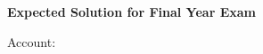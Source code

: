 \documentclass[a4paper]{article}
\begin{document}
\thispagestyle{empty}

\textbf{Expected Solution for Final Year Exam}

\vspace{1cm}

Account: %

\vspace{1cm}

\begin{Verbatim}[breaklines=true]
%TOC%
\end{Verbatim}
\end{document}
